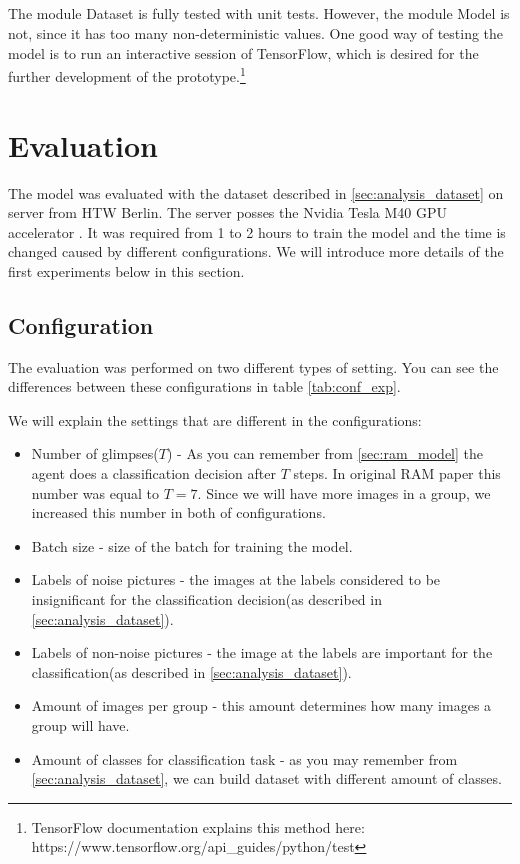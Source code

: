 \subparagraph{} The module Dataset is fully tested with unit tests. However,
the module Model is not, since it has too many non-deterministic values.
One good way of testing the model is to run an interactive session of TensorFlow,
which is desired for the further development of the prototype.\footnote{
TensorFlow documentation explains this method here: https://www.tensorflow.org/api_guides/python/test
}

\section{Evaluation} The model was evaluated with the dataset described
in \autoref{sec:analysis_dataset} on server from HTW Berlin. The server
posses the Nvidia Tesla M40 GPU accelerator \cite{NVIDIA}.
It was required from 1 to 2 hours to train the model and the time is changed
caused by different configurations.
We will introduce more details of the first experiments below in this section.

\subsection{Configuration}
The evaluation was performed on two different types of setting.
You can see the differences between these configurations
in table \ref{tab:conf_exp}.

We will explain the settings that are different in the configurations:
\begin{itemize}
	\item Number of glimpses($T$) - As you can remember from \autoref{sec:ram_model}
	the agent does a classification decision after $T$ steps. In original RAM
	paper this number was equal to $T=7$. Since we will have more images in a group,
	we increased this number in both of configurations.
	\item Batch size - size of the batch for training the model.
	\item Labels of noise pictures - the images at the labels considered to be
	 	insignificant for the classification decision(as described in \autoref{sec:analysis_dataset}).
	\item Labels of non-noise pictures -  the image at the labels are important
		for the classification(as described in \autoref{sec:analysis_dataset}).

	\item Amount of images per group - this amount determines how many images
	a group will have.
	\item Amount of classes for classification task - as you may remember from
		\autoref{sec:analysis_dataset}, we can build dataset with different
		amount of classes.
\end{itemize}

